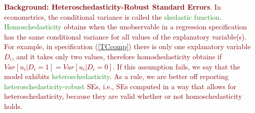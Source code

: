 \noindent \textcolor{Maroon}{\textbf{Background: Heteroschedasticity-Robust Standard Errors}. In econometrics, the conditional variance is called the \textcolor{ForestGreen}{skedastic function}. \textcolor{ForestGreen}{Homoschedasticity} obtains when the unobservable in a regression specification has the same conditional variance for all values of the explanatory variable(s). For example, in specification (\ref{TCcomp}) there is only one explanatory variable $D_i$, and it takes only two values, therefore homoshedasticity obtains if $Var[u_i|D_i=1]=Var[u_i|D_i=0]$. If this assumption fails, we say that the model exhibits \textcolor{ForestGreen}{heteroschedasticity}. As a rule, we are better off reporting \textcolor{ForestGreen}{heteroschedasticity-robust} SEs, i.e.,  SEs computed in a way that allows for heteroschedasticity, because they are valid whether or not homoschedasticity holds.}\\

